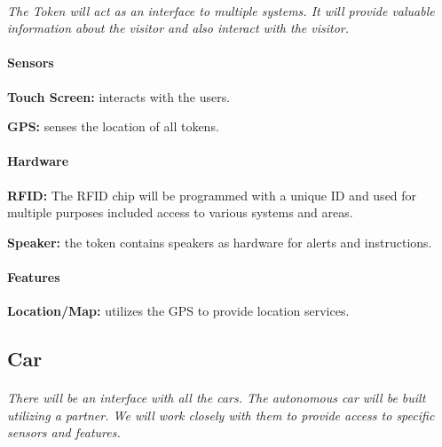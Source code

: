 \documentclass[12pt]{article}
\begin{document}
	\paragraph{} \textit{The Token will act as an interface to multiple systems. 
	It will provide valuable information about the visitor and also interact with 
	the visitor. }
		
	\paragraph{Sensors}
	\begin{list}{}{}
		\item \textbf{Touch Screen: } interacts with the users. 
		\item \textbf{GPS: } senses the location of all tokens.
	\end{list}
		
	\paragraph{Hardware}
	\begin{list}{}{}
		\item \textbf{RFID: } The RFID chip will be programmed with a unique ID and 
		used for multiple purposes included access to various systems and areas.
		\item \textbf{Speaker: }the token contains speakers as hardware for alerts 
		and instructions.
	\end{list}

	\paragraph{Features}
	\begin{list}{}{}
		\item \textbf{Location/Map: }utilizes the GPS to provide location services.
	\end{list}

	\subsection{Car}
	\paragraph{} \textit{There will be an interface with all the cars. The autonomous 
	car will be built utilizing a partner. We will work closely with them to provide 
	access to specific sensors and features.}		
	
\end{document}
